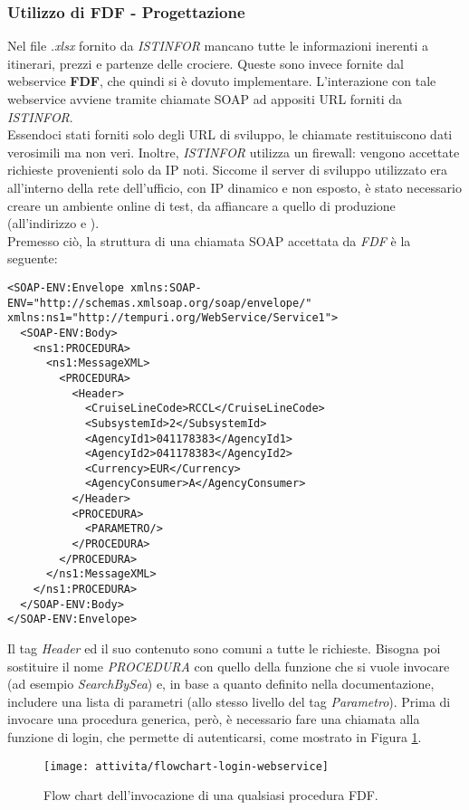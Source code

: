 \subsubsection{Utilizzo di FDF - Progettazione}
Nel file \textit{.xlsx} fornito da \textit{ISTINFOR} mancano tutte le informazioni inerenti a itinerari, prezzi e partenze delle crociere. Queste sono invece fornite dal \gls{webservice} \textbf{FDF}, che quindi si è dovuto implementare. L'interazione con tale \gls{webservice} avviene tramite chiamate \gls{SOAP} ad appositi URL forniti da \textit{ISTINFOR}.\\ Essendoci stati forniti solo degli URL di sviluppo, le chiamate restituiscono dati verosimili ma non veri. Inoltre, \textit{ISTINFOR} utilizza un firewall: vengono accettate richieste provenienti solo da IP noti. Siccome il server di sviluppo utilizzato era all'interno della rete dell'ufficio, con IP dinamico e non esposto, è stato necessario creare un ambiente online di test, da affiancare a quello di produzione (all'indirizzo \cite{site:sviluppo-crociereregalo} e \cite{site:sviluppo-dataexchange}).\\
Premesso ciò, la struttura di una chiamata \gls{SOAP} accettata da \textit{FDF} è la seguente:
\begin{lstlisting}
<SOAP-ENV:Envelope xmlns:SOAP-ENV="http://schemas.xmlsoap.org/soap/envelope/" xmlns:ns1="http://tempuri.org/WebService/Service1">
  <SOAP-ENV:Body>
    <ns1:PROCEDURA>
      <ns1:MessageXML>
        <PROCEDURA>
          <Header>
            <CruiseLineCode>RCCL</CruiseLineCode>
            <SubsystemId>2</SubsystemId>
            <AgencyId1>041178383</AgencyId1>
            <AgencyId2>041178383</AgencyId2>
            <Currency>EUR</Currency>
            <AgencyConsumer>A</AgencyConsumer>
          </Header>
          <PROCEDURA>
            <PARAMETRO/>
          </PROCEDURA>
        </PROCEDURA>
      </ns1:MessageXML>
    </ns1:PROCEDURA>
  </SOAP-ENV:Body>
</SOAP-ENV:Envelope>
\end{lstlisting}
Il tag \textit{Header} ed il suo contenuto sono comuni a tutte le richieste. Bisogna poi sostituire il nome \textit{PROCEDURA} con quello della funzione che si vuole invocare (ad esempio \textit{SearchBySea}) e, in base a quanto definito nella documentazione, includere una lista di parametri (allo stesso livello del tag \textit{Parametro}). Prima di invocare una procedura generica, però, è necessario fare una chiamata alla funzione di login, che permette di autenticarsi, come mostrato in Figura \ref{figura:flowchart-login-webservice}.
\begin{figure}[!h] 
	\centering 
	\texttt{[image: attivita/flowchart-login-webservice]} 
	\caption{Flow chart dell'invocazione di una qualsiasi procedura FDF.}
	\label{figura:flowchart-login-webservice}
\end{figure}\\
